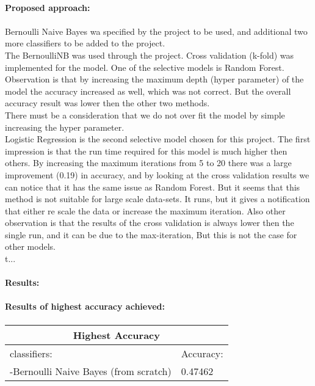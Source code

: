 \documentclass[12pt]{report}
\begin{document}
	
	
	\paragraph{Proposed approach:}
	\paragraph{}
		Bernoulli Naive Bayes wa specified by the project to be used, and additional two more classifiers to be added to the project.\\
		The BernoulliNB was used through the project. Cross validation (k-fold) was implemented for the model. 
		One of the selective models is Random Forest. Observation is that by increasing the maximum depth (hyper parameter) of the model the accuracy increased as well, which was not correct. But the overall accuracy result was lower then the other two methods. \\
		There must be a consideration that we do not over fit the model by simple increasing the hyper parameter. \\
		Logistic Regression is the second selective model chosen for this project. The first impression is that the run time required for this model is much higher then others. By increasing the maximum iterations from 5 to 20 there was a large improvement (0.19) in accuracy, and by looking at the cross validation results we can notice that it has the same issue as Random Forest. But it seems that this method is not suitable for large scale data-sets. It runs, but it gives a notification that either re scale the data or increase the maximum iteration. Also other observation is that the results of the cross validation is always lower then the single run, and it can be due to the max-iteration, But this is not the case for other models. \\t...


	
	
	\paragraph{Results:}
	\paragraph{}
	\paragraph{Results of highest accuracy achieved:}
	\paragraph{}
	\begin{center}
		\begin{tabular}{ |p{3cm}||p{3cm}| }
			\hline
			\multicolumn{2}{|c|}{Highest Accuracy} \\
			\hline
			classifiers:& Accuracy:\\
			\hline
			-Bernoulli Naive Bayes (from scratch)   & 0.47462\\
			\hline
		\end{tabular}
	\end{center}
	
\end{document}
